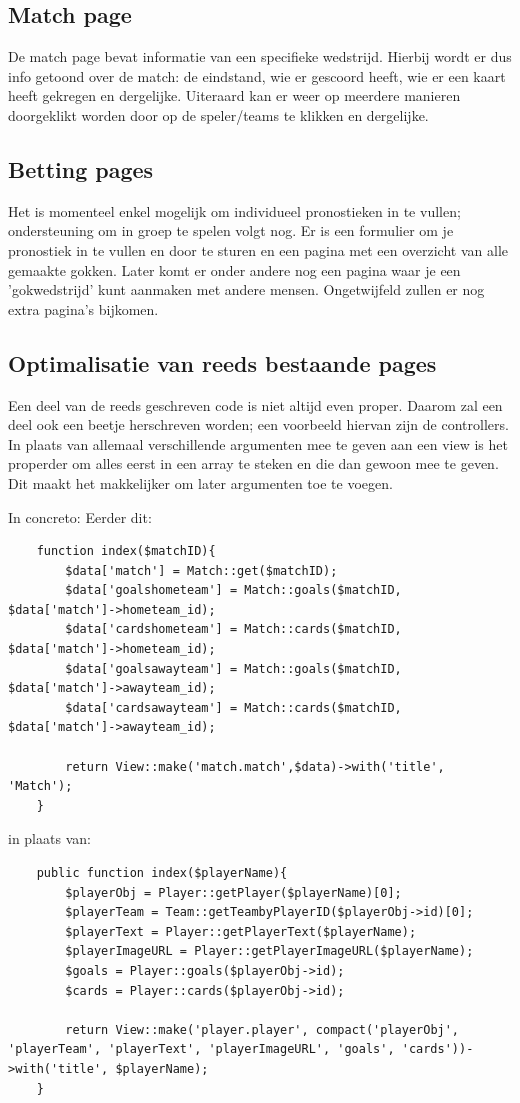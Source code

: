 \documentclass[11pt, a4paper]{article}
\begin{document}
\subsection{Match page}
De match page bevat informatie van een specifieke wedstrijd. Hierbij wordt er dus info getoond over de match: de eindstand, wie er gescoord heeft, wie er een kaart heeft gekregen en dergelijke. Uiteraard kan er weer op meerdere manieren doorgeklikt worden door op de speler/teams te klikken en dergelijke.

\subsection{Betting pages}
Het is momenteel enkel mogelijk om individueel pronostieken in te vullen; ondersteuning om in groep te spelen volgt nog. Er is een formulier om je pronostiek in te vullen en door te sturen en een pagina met een overzicht van alle gemaakte gokken. Later komt er onder andere nog een pagina waar je een 'gokwedstrijd' kunt aanmaken met andere mensen. Ongetwijfeld zullen er nog extra pagina's bijkomen.

\subsection{Optimalisatie van reeds bestaande pages}
Een deel van de reeds geschreven code is niet altijd even proper. Daarom zal een deel ook een beetje herschreven worden; een voorbeeld hiervan zijn de controllers. In plaats van allemaal verschillende argumenten mee te geven aan een view is het properder om alles eerst in een array te steken en die dan gewoon mee te geven. Dit maakt het makkelijker om later argumenten toe te voegen.

In concreto:
Eerder dit:
\begin{lstlisting}
	function index($matchID){
		$data['match'] = Match::get($matchID);
		$data['goalshometeam'] = Match::goals($matchID, $data['match']->hometeam_id);
		$data['cardshometeam'] = Match::cards($matchID, $data['match']->hometeam_id);
		$data['goalsawayteam'] = Match::goals($matchID, $data['match']->awayteam_id);
		$data['cardsawayteam'] = Match::cards($matchID, $data['match']->awayteam_id);

		return View::make('match.match',$data)->with('title', 'Match');
	}
\end{lstlisting}

in plaats van:
\begin{lstlisting}
	public function index($playerName){
		$playerObj = Player::getPlayer($playerName)[0];
		$playerTeam = Team::getTeambyPlayerID($playerObj->id)[0];
		$playerText = Player::getPlayerText($playerName);
		$playerImageURL = Player::getPlayerImageURL($playerName);
		$goals = Player::goals($playerObj->id);
		$cards = Player::cards($playerObj->id);

		return View::make('player.player', compact('playerObj', 'playerTeam', 'playerText', 'playerImageURL', 'goals', 'cards'))->with('title', $playerName);
	}
\end{lstlisting}
\end{document}
